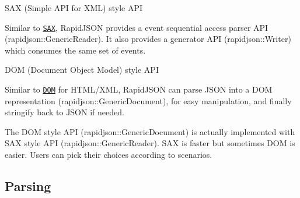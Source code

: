 \begin{DoxyItemize}
\item S\+AX (Simple A\+PI for X\+ML) style A\+PI
\begin{DoxyItemize}
\item Similar to \href{http://en.wikipedia.org/wiki/Simple_API_for_XML}{\tt S\+AX}, Rapid\+J\+S\+ON provides a event sequential access parser A\+PI ({\ttfamily rapidjson\+::\+Generic\+Reader}). It also provides a generator A\+PI ({\ttfamily rapidjson\+::\+Writer}) which consumes the same set of events.
\end{DoxyItemize}
\item D\+OM (Document Object Model) style A\+PI
\begin{DoxyItemize}
\item Similar to \href{http://en.wikipedia.org/wiki/Document_Object_Model}{\tt D\+OM} for H\+T\+M\+L/\+X\+ML, Rapid\+J\+S\+ON can parse J\+S\+ON into a D\+OM representation ({\ttfamily rapidjson\+::\+Generic\+Document}), for easy manipulation, and finally stringify back to J\+S\+ON if needed.
\item The D\+OM style A\+PI ({\ttfamily rapidjson\+::\+Generic\+Document}) is actually implemented with S\+AX style A\+PI ({\ttfamily rapidjson\+::\+Generic\+Reader}). S\+AX is faster but sometimes D\+OM is easier. Users can pick their choices according to scenarios.
\end{DoxyItemize}
\end{DoxyItemize}

\subsection*{Parsing}


